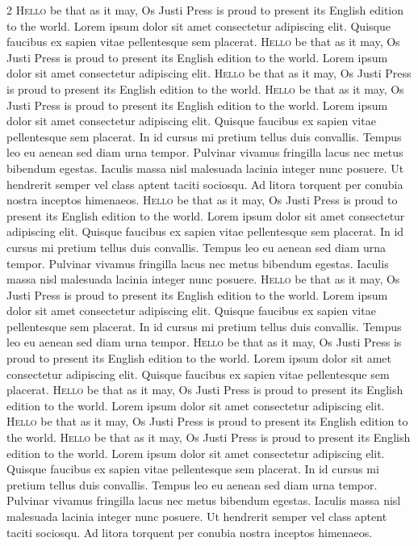 \documentclass[openany]{book}
\begin{document}
\begin{multicols}{2}
\lettrine[lines=2]{H}{ello} be that as it may, Os Justi Press is proud to present its English edition to the world. Lorem ipsum dolor sit amet consectetur adipiscing elit. Quisque faucibus ex sapien vitae pellentesque sem placerat.
\lettrine[lines=2]{H}{ello} be that as it may, Os Justi Press is proud to present its English edition to the world. Lorem ipsum dolor sit amet consectetur adipiscing elit.
\lettrine[lines=2]{H}{ello} be that as it may, Os Justi Press is proud to present its English edition to the world.
\lettrine[lines=2]{H}{ello} be that as it may, Os Justi Press is proud to present its English edition to the world. Lorem ipsum dolor sit amet consectetur adipiscing elit. Quisque faucibus ex sapien vitae pellentesque sem placerat. In id cursus mi pretium tellus duis convallis. Tempus leo eu aenean sed diam urna tempor. Pulvinar vivamus fringilla lacus nec metus bibendum egestas. Iaculis massa nisl malesuada lacinia integer nunc posuere. Ut hendrerit semper vel class aptent taciti sociosqu. Ad litora torquent per conubia nostra inceptos himenaeos.
\lettrine[lines=2]{H}{ello} be that as it may, Os Justi Press is proud to present its English edition to the world. Lorem ipsum dolor sit amet consectetur adipiscing elit. Quisque faucibus ex sapien vitae pellentesque sem placerat. In id cursus mi pretium tellus duis convallis. Tempus leo eu aenean sed diam urna tempor. Pulvinar vivamus fringilla lacus nec metus bibendum egestas. Iaculis massa nisl malesuada lacinia integer nunc posuere.
\lettrine[lines=2]{H}{ello} be that as it may, Os Justi Press is proud to present its English edition to the world. Lorem ipsum dolor sit amet consectetur adipiscing elit. Quisque faucibus ex sapien vitae pellentesque sem placerat. In id cursus mi pretium tellus duis convallis. Tempus leo eu aenean sed diam urna tempor.
\lettrine[lines=2]{H}{ello} be that as it may, Os Justi Press is proud to present its English edition to the world. Lorem ipsum dolor sit amet consectetur adipiscing elit. Quisque faucibus ex sapien vitae pellentesque sem placerat.
\lettrine[lines=2]{H}{ello} be that as it may, Os Justi Press is proud to present its English edition to the world. Lorem ipsum dolor sit amet consectetur adipiscing elit.
\lettrine[lines=2]{H}{ello} be that as it may, Os Justi Press is proud to present its English edition to the world.
\lettrine[lines=2]{H}{ello} be that as it may, Os Justi Press is proud to present its English edition to the world. Lorem ipsum dolor sit amet consectetur adipiscing elit. Quisque faucibus ex sapien vitae pellentesque sem placerat. In id cursus mi pretium tellus duis convallis. Tempus leo eu aenean sed diam urna tempor. Pulvinar vivamus fringilla lacus nec metus bibendum egestas. Iaculis massa nisl malesuada lacinia integer nunc posuere. Ut hendrerit semper vel class aptent taciti sociosqu. Ad litora torquent per conubia nostra inceptos himenaeos.

\end{multicols}
\end{document}
